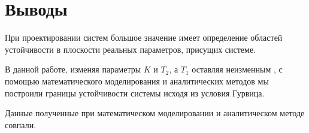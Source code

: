 \documentclass[a4paper, 12pt]{article}
\begin{document}
\section*{\centering Выводы}
При проектировании систем большое значение имеет определение областей устойчивости в плоскости реальных параметров, присущих системе.\par
 В данной работе, изменяя параметры $K$ и $T_2$, а $T_1$ оставляя неизменным , с помощью математического моделирования и аналитических методов мы построили границы устойчивости системы исходя из условия Гурвица.\par Данные полученные при математическом моделировании и аналитическом методе совпали. 
\end{document}
